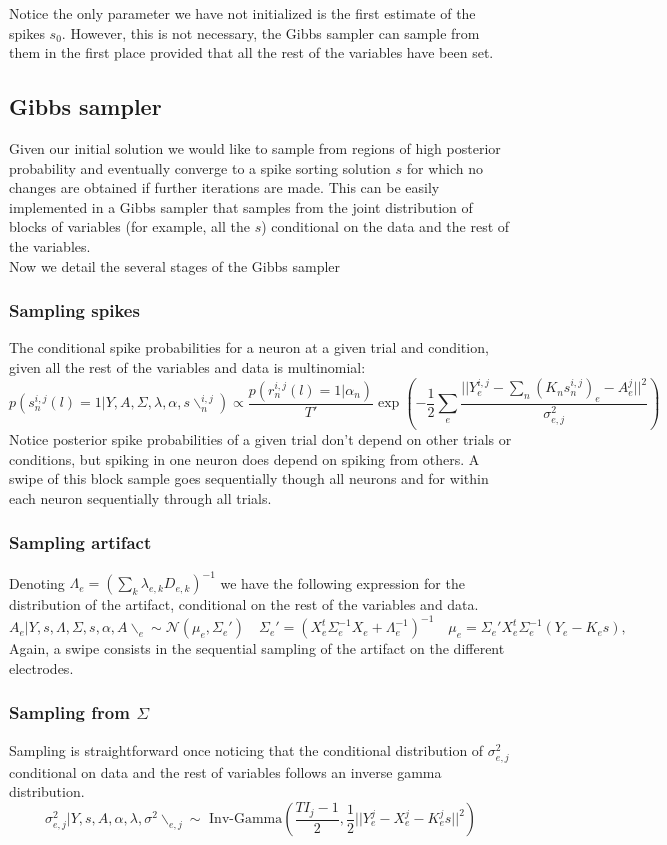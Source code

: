 \documentclass[12pt,letterpaper,fleqn]{article}
\begin{document}
Notice the only parameter we have not initialized is the first estimate of the spikes $s_0$. However, this is not necessary, the Gibbs sampler can sample from them in the first place provided that all the rest of the variables have been set.  
\subsection{Gibbs sampler}
Given our initial solution we would like to sample from regions of high posterior probability and eventually converge to a spike sorting solution $s$ for which no changes are obtained if further iterations are made. This can be easily implemented in a Gibbs sampler  that samples from the joint distribution of blocks of variables (for example, all the $s$) conditional on the data and the rest of the variables. \\Now we detail the several stages of the Gibbs sampler
\subsubsection{Sampling spikes}
The conditional spike probabilities for a neuron at a given trial and condition, given all the rest of the variables and data is multinomial:
$$p(s_n^{i,j}(l)=1|Y,A,\Sigma,\lambda,\alpha,s\backslash_{n}^{i,j})\propto \frac{p(r_n^{i,j}(l)=1|\alpha_n)}{T'}\exp\left(-\frac{1}{2}\sum_e \frac{||Y_e^{i,j}-\sum_n (K_n  s_n^{i,j})_e-A^j_e||^2}{\sigma^2_{e,j}}\right)$$
Notice posterior spike probabilities of a given trial don't depend on other trials or conditions, but spiking in one neuron does depend on spiking from others. A swipe of this block sample goes sequentially though all neurons and for within each neuron sequentially through all trials. 
\subsubsection{Sampling artifact}
Denoting $\Lambda_e=\left(\sum_k \lambda_{e,k} D_{e,k}\right)^{-1}$ we have the following expression for the distribution of the artifact, conditional on the rest of the variables and data.
$$A_e|Y,s,\Lambda,\Sigma,s,\alpha,A\backslash_{e}\sim \mathcal{N}(\mu_e,\Sigma_e')\quad \Sigma_e'=\left(X_e^t\Sigma_e^{-1}X_e+\Lambda_e^{-1}\right)^{-1}\quad \mu_e=\Sigma_e'X_e^t\Sigma_e^{-1}(Y_e-K_es),$$
Again, a swipe consists in the sequential sampling of the artifact on the different electrodes.
\subsubsection{Sampling from $\Sigma$}
Sampling is straightforward once noticing that the conditional distribution of $\sigma^2_{e,j}$ conditional on data and the rest of variables follows an inverse gamma distribution.
$$\sigma^2_{e,j}|Y,s,A,\alpha,\lambda,\sigma^2\backslash_{e,j}\sim\text{ Inv-Gamma}\left(\frac{T I_j-1}{2},\frac{1}{2}||Y_e^j-X_e^j-K_e^js||^2\right)$$
\end{document}
